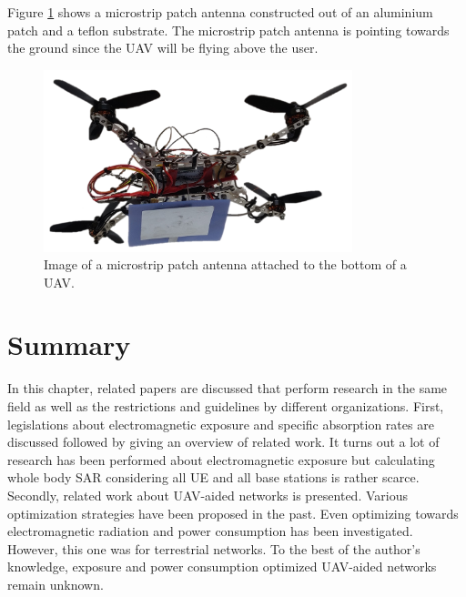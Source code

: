 Figure \ref{fig:exampleDrone} shows a microstrip patch antenna 
constructed out of an aluminium patch and a teflon substrate. The microstrip patch 
antenna is pointing towards the ground since the \gls{UAV} will be flying above the user.

\begin{figure}[H]
\centering
  \includegraphics[width=0.8\textwidth]{../images/drone.png}
  \caption{Image of a microstrip patch antenna attached to the bottom of a \gls{UAV}. }
  \label{fig:exampleDrone}
\end{figure}


\section{Summary}
In this chapter, related papers are discussed that perform research in the same field as well
as the restrictions and guidelines by different organizations.
First, legislations about electromagnetic exposure and specific absorption rates are discussed followed 
by giving an overview of related work. It turns out a lot of research has been performed about electromagnetic exposure
but calculating whole body \gls{SAR} considering all \gls{UE} and all base stations is rather scarce.
Secondly, related work about \gls{UAV}-aided networks is presented. Various optimization strategies 
have been proposed in the past. Even optimizing towards electromagnetic radiation and power consumption has been investigated. However, 
this one was for terrestrial networks. To the best of the author's knowledge, 
 exposure and power consumption optimized \gls{UAV}-aided networks remain unknown.

